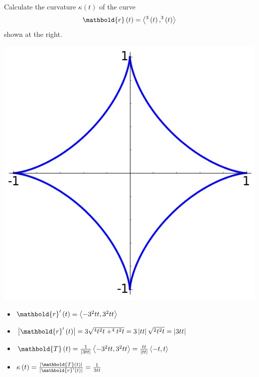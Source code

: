 \documentclass[12pt,addpoints]{exam}
\let\cos\relax\DeclareMathOperator{\cos}{\mathsf{cos}}
\let\sin\relax\DeclareMathOperator{\sin}{\mathsf{sin}}
\begin{document}
\begin{questions}
\ifprintanswers\else\begin{multicols}{2}\fi
\question[25] Calculate the curvature
$\kappa\left(t\right)$ of the curve
\[\mathbold{r}\left(t\right)
=\left\langle\cos^3\left(t\right),\sin^3\left(t\right)
\right\rangle\]
\ifprintanswers\else
shown at the right.
\begin{center}\includegraphics[scale=.4]{Astroid}\end{center}
\end{multicols}\fi
\begin{solution}
\begin{itemize}
\item $\mathbold{r}'\left(t\right)=
\left\langle -3\cos^2{t}\sin{t},3\sin^2{t}\cos{t}
\right\rangle$
\item $\left|\mathbold{r}'\left(t\right)\right|=
3\sqrt{\cos^4{t}\sin^2{t}+\sin^4{t}\cos^2{t}}
=3\left|\cos{t}\sin{t}\right|\sqrt{\sin^2{t}\cos^2{t}}
=\left|3\cos{t}\sin{t}\right|$
\item $\mathbold{T}\left(t\right)
=\frac{1}{\left|3\cos{t}\sin{t}\right|}
\left\langle -3\cos^2{t}\sin{t},3\sin^2{t}\cos{t}
\right\rangle
=\frac{\sin{t}\cos{t}}{\left|\sin{t}\cos{t}\right|}
\left\langle -\cos{t},\sin{t}\right\rangle$
\item $\kappa\left(t\right)
=\frac{\left|\mathbold{T}\left(t\right)\right|}
{\left|\mathbold{r}'\left(t\right)\right|}
=\frac{1}{3\sin{t}\cos{t}}$
\end{itemize}
\end{solution}

\end{questions}
\end{document}
